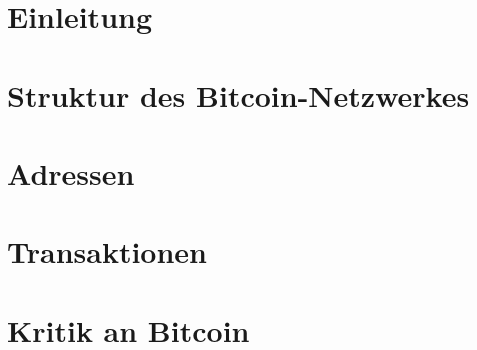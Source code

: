 \documentclass[12pt]{report}
\begin{document}


\tableofcontents

\chapter{Einleitung}


\chapter{Struktur des Bitcoin-Netzwerkes}


\chapter{Adressen}


\chapter{Transaktionen}


\chapter{Kritik an Bitcoin}

\end{document}
